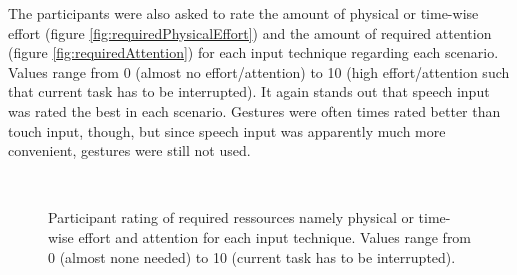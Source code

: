 The participants were also asked to rate the amount of physical or time-wise effort (figure \ref{fig:requiredPhysicalEffort}) and the amount of required attention (figure \ref{fig:requiredAttention}) for each input technique regarding each scenario. Values range from 0 (almost no effort/attention) to 10 (high effort/attention such that current task has to be interrupted). It again stands out that speech input was rated the best in each scenario. Gestures were often times rated better than touch input, though, but since speech input was apparently much more convenient, gestures were still not used.

\begin{figure}[bth]
	\myfloatalign
	 \\
	\caption{Participant rating of required ressources namely physical or time-wise effort and attention for each input technique. Values range from 0 (almost none needed) to 10 (current task has to be interrupted).}
	\label{fig:requiredRessources}
\end{figure}











